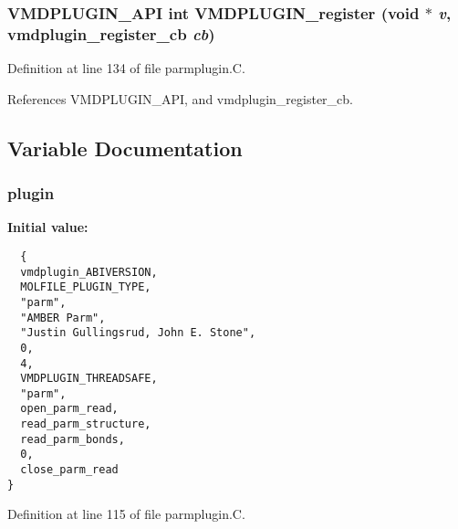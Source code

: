 \subsubsection{\setlength{\rightskip}{0pt plus 5cm}VMDPLUGIN\_\-API int VMDPLUGIN\_\-register (void $\ast$ {\em v}, {\bf vmdplugin\_\-register\_\-cb} {\em cb})}\label{parmplugin_8C_a7}




Definition at line 134 of file parmplugin.C.

References VMDPLUGIN\_\-API, and vmdplugin\_\-register\_\-cb.

\subsection{Variable Documentation}
\subsubsection{ plugin\hspace{0.3cm}{\tt  [static]}}\label{parmplugin_8C_a0}


{\bf Initial value:}

\footnotesize\begin{verbatim}  {
  vmdplugin_ABIVERSION,                                 
  MOLFILE_PLUGIN_TYPE,                                  
  "parm",                                               
  "AMBER Parm",                                         
  "Justin Gullingsrud, John E. Stone",                  
  0,                                                    
  4,                                                    
  VMDPLUGIN_THREADSAFE,                                 
  "parm",                                               
  open_parm_read,        
  read_parm_structure,   
  read_parm_bonds,
  0,                     
  close_parm_read        
}\end{verbatim}\normalsize 


Definition at line 115 of file parmplugin.C.